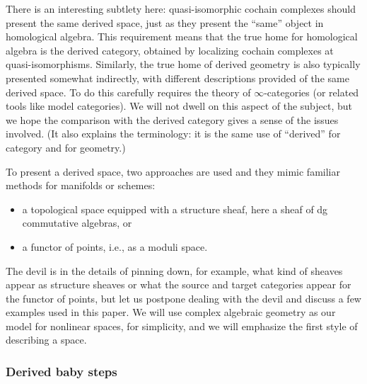 \documentclass[11pt]{amsart}
\begin{document}
There is an interesting subtlety here: quasi-isomorphic cochain complexes should present the same derived space, just as they present the ``same'' object in homological algebra.
This requirement means that the true home for homological algebra is the derived category,
obtained by localizing cochain complexes at quasi-isomorphisms.
Similarly, the true home of derived geometry is also typically presented somewhat indirectly,
with different descriptions provided of the same derived space.
To do this carefully requires the theory of $\infty$-categories (or related tools like model categories).
We will not dwell on this aspect of the subject,
but we hope the comparison with the derived category gives a sense of the issues involved.
(It also explains the terminology: it is the same use of ``derived'' for category and for geometry.)

To present a derived space, two approaches are used and they mimic familiar methods for manifolds or schemes:
\begin{itemize}
\item a topological space equipped with a structure sheaf, here a sheaf of dg commutative algebras, or
\item a functor of points, i.e., as a moduli space.
\end{itemize}
The devil is in the details of pinning down, for example, what kind of sheaves appear as structure sheaves or what the source and target categories appear for the functor of points,
but let us postpone dealing with the devil and discuss a few examples used in this paper.
We will use complex algebraic geometry as our model for nonlinear spaces, for simplicity,
and we will emphasize the first style of describing a space.

\subsubsection{Derived baby steps}
\end{document}
